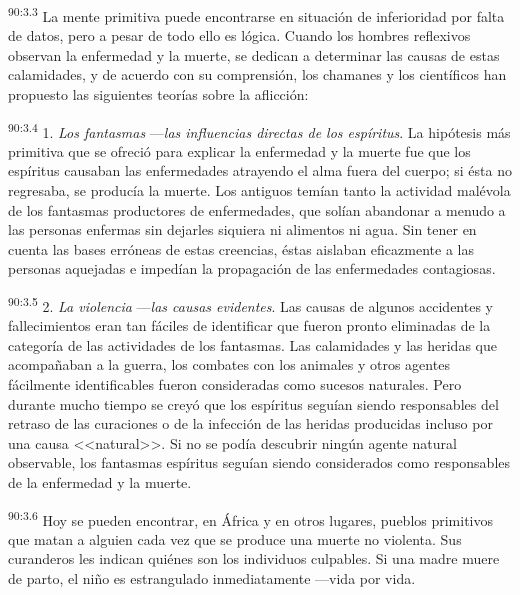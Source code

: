 \documentclass[twoside, 11pt]{book}
\begin{document}
\par
\textsuperscript{90:3.3} La mente primitiva puede encontrarse en situación de inferioridad por falta de datos, pero a pesar de todo ello es lógica. Cuando los hombres reflexivos observan la enfermedad y la muerte, se dedican a determinar las causas de estas calamidades, y de acuerdo con su comprensión, los chamanes y los científicos han propuesto las siguientes teorías sobre la aflicción:

\par
\textsuperscript{90:3.4} 1. \textit{Los fantasmas} ---\textit{las influencias directas de los espíritus}. La hipótesis más primitiva que se ofreció para explicar la enfermedad y la muerte fue que los espíritus causaban las enfermedades atrayendo el alma fuera del cuerpo; si ésta no regresaba, se producía la muerte. Los antiguos temían tanto la actividad malévola de los fantasmas productores de enfermedades, que solían abandonar a menudo a las personas enfermas sin dejarles siquiera ni alimentos ni agua. Sin tener en cuenta las bases erróneas de estas creencias, éstas aislaban eficazmente a las personas aquejadas e impedían la propagación de las enfermedades contagiosas.

\par
\textsuperscript{90:3.5} 2. \textit{La violencia} ---\textit{las causas evidentes}. Las causas de algunos accidentes y fallecimientos eran tan fáciles de identificar que fueron pronto eliminadas de la categoría de las actividades de los fantasmas. Las calamidades y las heridas que acompañaban a la guerra, los combates con los animales y otros agentes fácilmente identificables fueron consideradas como sucesos naturales. Pero durante mucho tiempo se creyó que los espíritus seguían siendo responsables del retraso de las curaciones o de la infección de las heridas producidas incluso por una causa <<natural>>. Si no se podía descubrir ningún agente natural observable, los fantasmas espíritus seguían siendo considerados como responsables de la enfermedad y la muerte.

\par
\textsuperscript{90:3.6} Hoy se pueden encontrar, en África y en otros lugares, pueblos primitivos que matan a alguien cada vez que se produce una muerte no violenta. Sus curanderos les indican quiénes son los individuos culpables. Si una madre muere de parto, el niño es estrangulado inmediatamente ---vida por vida.
\end{document}
